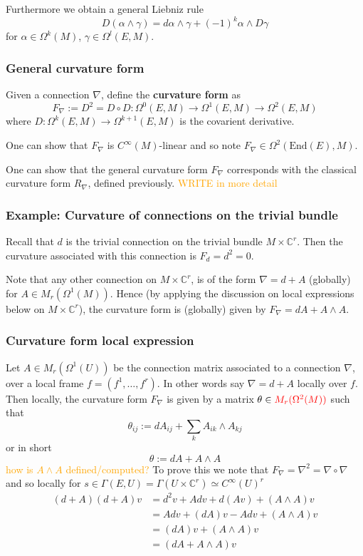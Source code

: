 \documentclass[a4paper]{article}
\theoremstyle{definition} \newtheorem*{definition}{Definition}
\theoremstyle{definition} \newtheorem*{definitions}{Definitions}
\theoremstyle{plain} \newtheorem{theorem}{Theorem}[section]
\theoremstyle{plain} \newtheorem{proposition}[theorem]{Proposition}
\theoremstyle{plain} \newtheorem{corollary}[theorem]{Corollary}
\theoremstyle{plain} \newtheorem{lemma}[theorem]{Lemma}
\theoremstyle{plain} \newtheorem{example}[theorem]{Example}
\newcommand{\checkCorrect}[1]{\textcolor{red}{#1}}
\newcommand{\understandBetter}[1]{\textcolor{orange}{#1}}
\newcommand{\defn}[1]{\textbf{#1}}
\newcommand{\complexnos}{\mathbb{C}}
\newcommand{\End}{\text{End}}
\newcommand{\smooth}{C^\infty}
\begin{document}
Furthermore we obtain a general Liebniz rule
$$D(\alpha \wedge \gamma)=d\alpha \wedge \gamma + (-1)^k \alpha \wedge D\gamma$$
for $\alpha \in \Omega^k(M)$, $\gamma\in \Omega^l(E, M)$. 

\subsubsection{General curvature form}
Given a connection $\nabla$, define the \defn{curvature form} as
$$F_\nabla := D^2 = D\circ D: \Omega^0(E, M)\to \Omega^1(E, M) \to \Omega^2(E, M)$$
where $D:\Omega^k(E, M)\to \Omega^{k+1}(E, M)$ is the covarient derivative. 

One can show that $F_\nabla$ is $\smooth(M)$-linear and so note $F_\nabla \in \Omega^2(\End(E), M)$. 

One can show that the general curvature form $F_\nabla$ corresponds with the classical curvature form $R_\nabla$, defined previously.
\understandBetter{WRITE in more detail}

\subsubsection{Example: Curvature of connections on the trivial bundle}
Recall that $d$ is the trivial connection on the trivial bundle $M\times \complexnos^r$. Then the curvature associated with this connection is
$F_d = d^2 = 0$.

Note that any other connection on $M\times \complexnos^r$, is of the form $\nabla = d+A$ (globally) for $A\in M_r(\Omega^1(M))$. Hence (by applying the discussion on local expressions below on $M\times \complexnos^r$), the curvature form is (globally) given by $F_\nabla = dA+A\wedge A$. 

\subsubsection{Curvature form local expression}
Let $A\in M_r(\Omega^1(U))$ be the connection matrix associated to a connection $\nabla$, over a local frame $f=(f^1, \ldots , f^r)$. In other words say $\nabla=d+A$ locally over $f$. Then locally, the curvature form $F_\nabla$ is given by a matrix $\theta \in \checkCorrect{M_r(\Omega^2(M))}$ such that
$$\mathbb{\theta}_{ij} := dA_{ij} + \sum_k A_{ik}\wedge A_{kj}$$
or in short
$$\mathbb{\theta} := dA + A\wedge A$$
\understandBetter{how is $A\wedge A$ defined/computed?} To prove this we note that $F_\nabla = \nabla^2 = \nabla \circ \nabla$ and so locally for $s\in \Gamma(E, U)=\Gamma(U\times \complexnos^r)\simeq \smooth(U)^r$
\begin{align*}
    (d+A)(d+A)v & = d^2 v + A dv + d(Av) + (A\wedge A) v \\
    & = A dv + (dA) v - A  dv + (A\wedge A) v \\
    & = (dA) v  + (A\wedge A) v \\
    & = (dA + A\wedge A) v
\end{align*}
\end{document}
